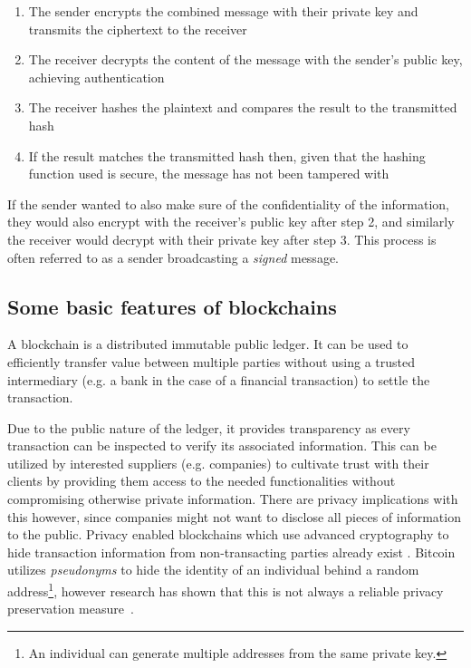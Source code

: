 \begin{enumerate}
\begin{enumerate}
        \item The sender encrypts the combined message with their private key and transmits the ciphertext to the receiver  
        \item The receiver decrypts the content of the message with the sender's public key, achieving authentication
        \item The receiver hashes the plaintext and compares the result to the transmitted hash
        \item If the result matches the transmitted hash  then, given that the hashing function used is secure,
        the message has not been tampered with
    \end{enumerate}
    If the sender wanted to also make sure of the confidentiality of the information, they would also encrypt with the receiver's public key after step 2, and similarly the receiver would decrypt with their private key after step 3. This process is often referred to as a sender broadcasting a \textit{signed} message.

\end{enumerate}

\subsection{Some basic features of blockchains} \label{advantages}
A blockchain is a distributed immutable public ledger. It can be used to efficiently transfer value between multiple parties without using a trusted intermediary (e.g. a bank in the case of a financial transaction) to settle the transaction. 

Due to the public nature of the ledger, it provides transparency as every transaction can be inspected to verify its associated information. This can be utilized by interested suppliers (e.g. companies) to cultivate trust with their clients by providing them access to the needed functionalities without compromising otherwise private information. There are privacy implications with this however, since companies might not want to disclose all pieces of information to the public. Privacy enabled blockchains which use advanced cryptography to hide transaction information from non-transacting parties already exist \cite{monero, zcash, pivx} . Bitcoin utilizes \textit{pseudonyms} to hide the identity of an individual behind a random address\footnote{An individual can generate multiple addresses from the same private key.}, however research has shown that this is not always a reliable privacy preservation measure~\cite{journals/corr/abs-1107-4524, DBLP:journals/corr/abs-1708-04748}.

